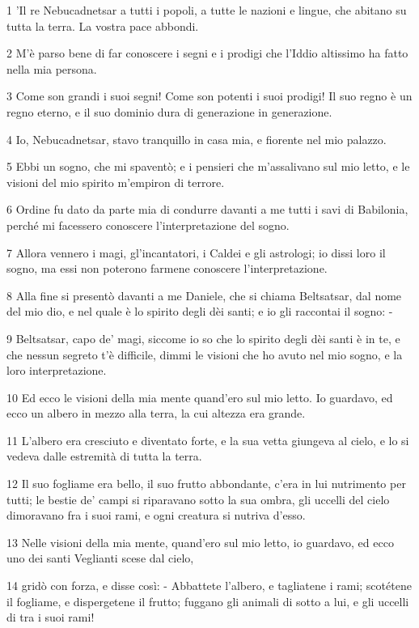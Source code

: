 \par 1 'Il re Nebucadnetsar a tutti i popoli, a tutte le nazioni e lingue, che abitano su tutta la terra. La vostra pace abbondi.
\par 2 M'è parso bene di far conoscere i segni e i prodigi che l'Iddio altissimo ha fatto nella mia persona.
\par 3 Come son grandi i suoi segni! Come son potenti i suoi prodigi! Il suo regno è un regno eterno, e il suo dominio dura di generazione in generazione.
\par 4 Io, Nebucadnetsar, stavo tranquillo in casa mia, e fiorente nel mio palazzo.
\par 5 Ebbi un sogno, che mi spaventò; e i pensieri che m'assalivano sul mio letto, e le visioni del mio spirito m'empiron di terrore.
\par 6 Ordine fu dato da parte mia di condurre davanti a me tutti i savi di Babilonia, perché mi facessero conoscere l'interpretazione del sogno.
\par 7 Allora vennero i magi, gl'incantatori, i Caldei e gli astrologi; io dissi loro il sogno, ma essi non poterono farmene conoscere l'interpretazione.
\par 8 Alla fine si presentò davanti a me Daniele, che si chiama Beltsatsar, dal nome del mio dio, e nel quale è lo spirito degli dèi santi; e io gli raccontai il sogno: -
\par 9 Beltsatsar, capo de' magi, siccome io so che lo spirito degli dèi santi è in te, e che nessun segreto t'è difficile, dimmi le visioni che ho avuto nel mio sogno, e la loro interpretazione.
\par 10 Ed ecco le visioni della mia mente quand'ero sul mio letto. Io guardavo, ed ecco un albero in mezzo alla terra, la cui altezza era grande.
\par 11 L'albero era cresciuto e diventato forte, e la sua vetta giungeva al cielo, e lo si vedeva dalle estremità di tutta la terra.
\par 12 Il suo fogliame era bello, il suo frutto abbondante, c'era in lui nutrimento per tutti; le bestie de' campi si riparavano sotto la sua ombra, gli uccelli del cielo dimoravano fra i suoi rami, e ogni creatura si nutriva d'esso.
\par 13 Nelle visioni della mia mente, quand'ero sul mio letto, io guardavo, ed ecco uno dei santi Veglianti scese dal cielo,
\par 14 gridò con forza, e disse così: - Abbattete l'albero, e tagliatene i rami; scotétene il fogliame, e dispergetene il frutto; fuggano gli animali di sotto a lui, e gli uccelli di tra i suoi rami!
